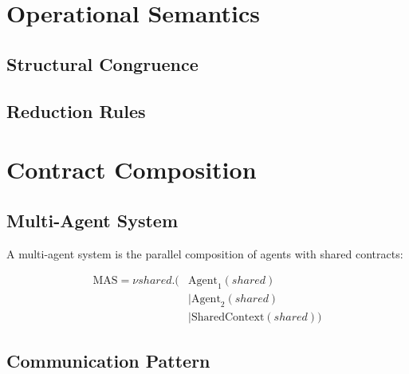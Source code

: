 \documentclass{article}
\begin{document}
\section{Operational Semantics}

\subsection{Structural Congruence}


\subsection{Reduction Rules}


\section{Contract Composition}

\subsection{Multi-Agent System}

A multi-agent system is the parallel composition of agents with shared contracts:

\begin{align*}
\text{MAS} = \nu shared. (&\text{Agent}_1(shared) \\
                          &\mid \text{Agent}_2(shared) \\
                          &\mid \text{SharedContext}(shared))
\end{align*}

\subsection{Communication Pattern}
\end{document}
